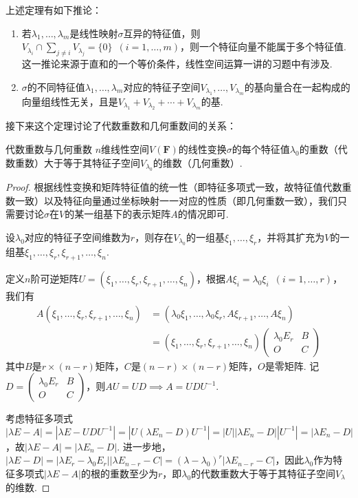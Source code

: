 上述定理有如下推论：
\begin{enumerate}
    \item 若$\lambda_1,\ldots,\lambda_m$是线性映射$\sigma$互异的特征值，则$V_{\lambda_i}\cap\sum\limits_{j\neq i}V_{\lambda_j}=\{0\}
              \enspace(i=1,\ldots,m)$，则一个特征向量不能属于多个特征值. 这一推论来源于直和的一个等价条件，线性空间运算一讲的习题中有涉及.

    \item $\sigma$的不同特征值$\lambda_1,\ldots,\lambda_m$对应的特征子空间$V_{\lambda_1},\ldots,V_{\lambda_m}$的基向量合在一起构成的向量组线性无关，且是$V_{\lambda_1}+V_{\lambda_2}+\cdots+V_{\lambda_m}$的基.
\end{enumerate}

接下来这个定理讨论了代数重数和几何重数间的关系：
\begin{theorem}{}{代数重数与几何重数}
    $n$维线性空间$V(\mathbf{F})$的线性变换$\sigma$的每个特征值$\lambda_0$的重数（代数重数）大于等于其特征子空间$V_{\lambda_0}$的维数（几何重数）.
\end{theorem}

\begin{proof}
    根据线性变换和矩阵特征值的统一性（即特征多项式一致，故特征值代数重数一致）以及特征向量通过坐标映射一一对应的性质（即几何重数一致），我们只需要讨论$\sigma$在$V$的某一组基下的表示矩阵$A$的情况即可.

    设$\lambda_0$对应的特征子空间维数为$r$，则存在$V_{\lambda_0}$的一组基$\xi_1,\ldots,\xi_r$，并将其扩充为$V$的一组基$\xi_1,\ldots,\xi_r,\xi_{r+1},\ldots,\xi_n$.

    定义$n$阶可逆矩阵$U=(\xi_1,\ldots,\xi_r,\xi_{r+1},\ldots,\xi_n)$，根据$A\xi_i=\lambda_0\xi_i\enspace(i=1,\ldots,r)$，我们有
    \begin{align*}
        A(\xi_1,\ldots,\xi_r,\xi_{r+1},\ldots,\xi_n) & = (\lambda_0\xi_1,\ldots,\lambda_0\xi_r,A\xi_{r+1},\ldots,A\xi_n) \\
                                                     & = (\xi_1,\ldots,\xi_r,\xi_{r+1},\ldots,\xi_n)
        \begin{pmatrix}
            \lambda_0 E_r & B \\ O & C
        \end{pmatrix}
    \end{align*}
    其中$B$是$r\times(n-r)$矩阵，$C$是$(n-r)\times(n-r)$矩阵，$O$是零矩阵. 记$D=\begin{pmatrix}
            \lambda_0 E_r & B \\ O & C
        \end{pmatrix}$，则$AU=UD\implies A=UDU^{-1}$.

    考虑特征多项式$|\lambda E-A|=|\lambda E-UDU^{-1}|=|U(\lambda E_n-D)U^{-1}|=|U||\lambda E_n-D||U^{-1}|=|\lambda E_n-D|$，故$|\lambda E-A|=|\lambda E_n-D|$. 进一步地，$|\lambda E-D|=|\lambda E_r-\lambda_0 E_r||\lambda E_{n-r}-C|=(\lambda-\lambda_0)^r|\lambda E_{n-r}-C|$，因此$\lambda_0$作为特征多项式$|\lambda E-A|$的根的重数至少为$r$，即$\lambda_0$的代数重数大于等于其特征子空间$V_{\lambda}$的维数.
\end{proof}


